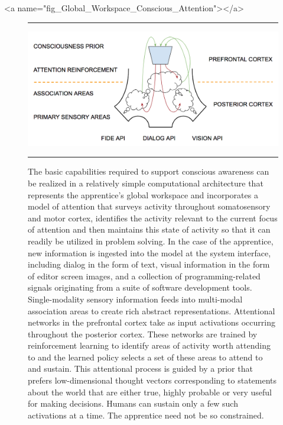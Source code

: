 \rawhtml
<a name="fig_Global_Workspace_Conscious_Attention"></a>
\endrawhtml
\begin{figure}
%
  \hrule{}
%
  \begin{center} 
    \includegraphics[width=530pt]{./figures/Global_Workspace_Conscious_Attention.png} %
  \end{center}
%
  \caption{The basic capabilities required to support conscious awareness can be realized in a relatively simple computational architecture that represents the apprentice’s global workspace and incorporates a model of attention that surveys activity throughout somatosensory and motor cortex, identifies the activity relevant to the current focus of attention and then maintains this state of activity so that it can readily be utilized in problem solving.  In the case of the apprentice, new information is ingested into the model at the system interface, including dialog in the form of text, visual information in the form of editor screen images, and a collection of programming-related signals originating from a suite of software development tools. 
%
Single-modality sensory information feeds into multi-modal association areas to create rich abstract representations. Attentional networks in the prefrontal cortex take as input activations occurring throughout the posterior cortex. These networks are trained by reinforcement learning to identify areas of activity worth attending to and the learned policy selects a set of these areas to attend to and sustain. This attentional process is guided by a prior that prefers low-dimensional thought vectors corresponding to statements about the world that are either true, highly probable or very useful for making decisions. Humans can sustain only a few such activations at a time. The apprentice need not be so constrained.}
%
  \hrule{}
%
\end{figure}

